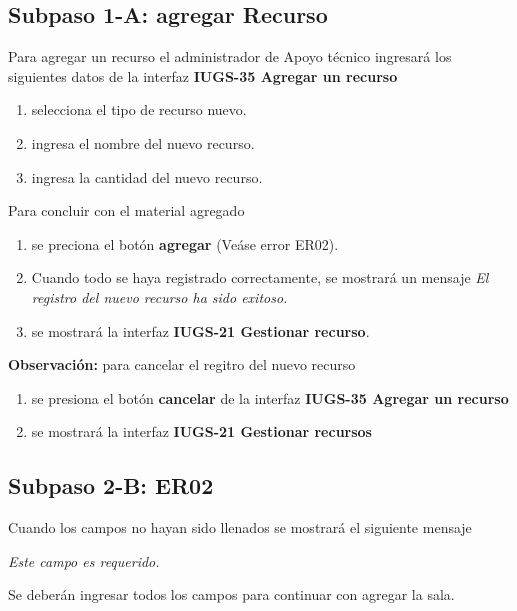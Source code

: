 \subsection{Subpaso 1-A: agregar Recurso}	
	Para agregar un recurso el administrador de Apoyo técnico ingresará
	los siguientes datos de la interfaz 
	\textbf{IUGS-35 Agregar un recurso}
	\begin{enumerate}
		\item selecciona el tipo de recurso nuevo.
		\item ingresa el nombre del nuevo recurso.
		\item ingresa la cantidad del nuevo recurso.
	\end{enumerate}
	
	Para concluir con el material agregado
	\begin{enumerate}
		\item se preciona el botón \textbf{agregar} (Veáse error ER02).
		\item Cuando todo se haya registrado correctamente, se mostrará 
			un mensaje \textit{El registro del nuevo recurso ha sido exitoso.}	
		\item se mostrará la interfaz \textbf{IUGS-21 Gestionar recurso}.
	\end{enumerate}
		
	\textbf{Observación:} para cancelar el regitro del nuevo recurso
		\begin{enumerate}
			\item se presiona el botón \textbf{cancelar} de la interfaz
				\textbf{IUGS-35 Agregar un recurso} 
			\item se mostrará la interfaz 	
				\textbf{IUGS-21 Gestionar recursos}
		\end{enumerate}

\subsection{Subpaso 2-B: ER02}
	Cuando los campos no hayan sido llenados
	se mostrará el siguiente mensaje \par	
	\textit{Este campo es requerido. }\par
	Se deberán ingresar todos los campos para continuar con agregar la sala.